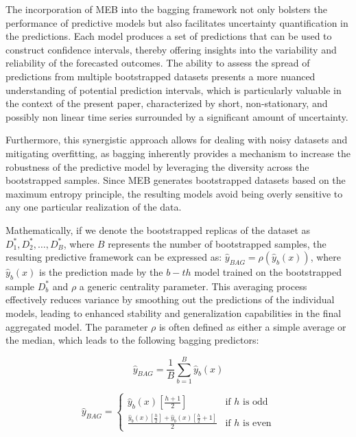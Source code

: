 \documentclass[preprint,11pt,authoryear]{elsarticle}
\begin{document}
The incorporation of MEB into the bagging framework not only bolsters the performance of predictive models but also facilitates uncertainty quantification in the predictions. Each model produces a set of predictions that can be used to construct confidence intervals, thereby offering insights into the variability and reliability of the forecasted outcomes. The ability to assess the spread of predictions from multiple bootstrapped datasets presents a more nuanced understanding of potential prediction intervals, which is particularly valuable in the context of the present paper, characterized by short, non-stationary, and possibly non linear time series surrounded by a significant amount of uncertainty.

Furthermore, this synergistic approach allows for dealing with noisy datasets and mitigating overfitting, as bagging inherently provides a mechanism to increase the robustness of the predictive model by leveraging the diversity across the bootstrapped samples. Since MEB generates bootstrapped datasets based on the maximum entropy principle, the resulting models avoid being overly sensitive to any one particular realization of the data.

Mathematically, if we denote the bootstrapped replicas of the dataset as $D^*_1, D^*_2, \ldots, D^*_B$, where $B$  represents the number of bootstrapped samples, the resulting predictive framework can be expressed as:  $\hat{y}_{\textit{BAG}} = \rho( \hat{y}_{b}(x) )$, where $\hat{y}_{b}(x)$ is the prediction made by the $b-th$ model trained on the bootstrapped sample $ D^*_b $  and $\rho$ a generic centrality parameter. 
This averaging process effectively reduces variance by smoothing out the predictions of the individual models, leading to enhanced stability and generalization capabilities in the final aggregated model.  The parameter $\rho$ is often defined as either a simple average or the median, which leads to the following bagging predictors:

\begin{equation}
	\hat{y}_{\textit{BAG}}  = \frac{1}{B} \sum_{b=1}^{B} \hat{y}_{b}(x)
\end{equation}

\begin{equation}
	\hat{y}_{\textit{BAG}}  = 
	\begin{cases} 
		\hat{y}_{b}(x) \left[\frac{h+1}{2}\right] & \text{if } h \text{ is odd} \\ 
		\frac{\hat{y}_{b}(x)\left[\frac{h}{2}\right] + \hat{y}_{b}(x)\left[\frac{h}{2} + 1\right]}{2} & \text{if } h \text{ is even} 
	\end{cases}
\end{equation}
\end{document}
